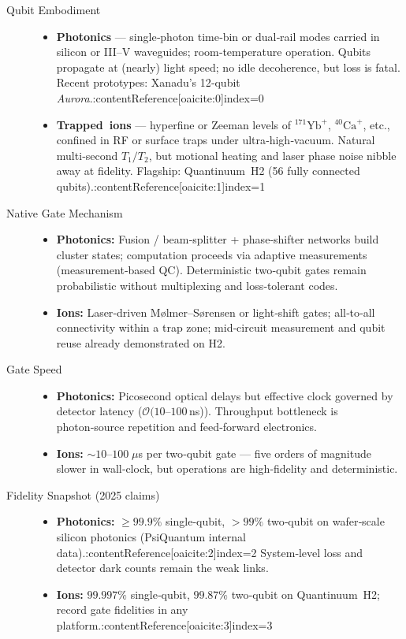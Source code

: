 \documentclass[11pt,a4paper]{article}
\begin{document}
\begin{description}
	\item[Qubit Embodiment]
	\begin{itemize}
		\item \textbf{Photonics} — single‑photon time‑bin or dual‑rail modes carried in silicon or III–V waveguides; room‑temperature operation.  Qubits propagate at (nearly) light speed; no idle decoherence, but loss is fatal.  Recent prototypes: Xanadu’s 12‑qubit \emph{Aurora}.:contentReference[oaicite:0]{index=0}
		\item \textbf{Trapped ions} — hyperfine or Zeeman levels of ${}^{171}\mathrm{Yb}^+$, ${}^{40}\mathrm{Ca}^+$, etc., confined in RF or surface traps under ultra‑high‑vacuum.  Natural multi‑second $T_1/T_2$, but motional heating and laser phase noise nibble away at fidelity.  Flagship: Quantinuum H2 (56 fully connected qubits).:contentReference[oaicite:1]{index=1}
	\end{itemize}
	
	\item[Native Gate Mechanism]
	\begin{itemize}
		\item \textbf{Photonics:} Fusion / beam‑splitter + phase‑shifter networks build cluster states; computation proceeds via adaptive measurements (measurement‑based QC).  Deterministic two‑qubit gates remain probabilistic without multiplexing and loss‑tolerant codes.
		\item \textbf{Ions:} Laser‑driven Mølmer–Sørensen or light‑shift gates; all‑to‑all connectivity within a trap zone; mid‑circuit measurement and qubit reuse already demonstrated on H2.
	\end{itemize}
	
	\item[Gate Speed]
	\begin{itemize}
		\item \textbf{Photonics:} Picosecond optical delays but effective clock governed by detector latency ($\mathcal{O}(10$–$100\,$ns)).  Throughput bottleneck is photon‑source repetition and feed‑forward electronics.
		\item \textbf{Ions:} $\sim\!10$–$100\;\mu$s per two‑qubit gate — five orders of magnitude slower in wall‑clock, but operations are high‑fidelity and deterministic.
	\end{itemize}
	
	\item[Fidelity Snapshot (2025 claims)]
	\begin{itemize}
		\item \textbf{Photonics:} $\ge \!99.9\%$ single‑qubit, $>99\%$ two‑qubit on wafer‑scale silicon photonics (PsiQuantum internal data).:contentReference[oaicite:2]{index=2}  System‑level loss and detector dark counts remain the weak links.
		\item \textbf{Ions:} $99.997\%$ single‑qubit, $99.87\%$ two‑qubit on Quantinuum H2; record gate fidelities in any platform.:contentReference[oaicite:3]{index=3}
	\end{itemize}
	

\end{description}
\end{document}

